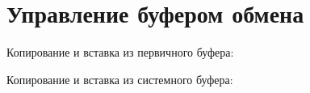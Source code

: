 \section{Управление буфером обмена}
\noindent Копирование и вставка из первичного буфера: \\

\noindent Копирование и вставка из системного буфера: \\
